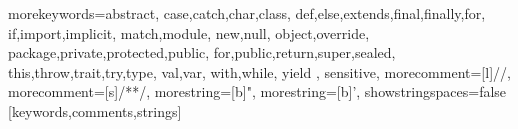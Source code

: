 
%
{morekeywords={abstract,%
  case,catch,char,class,%
  def,else,extends,final,finally,for,%
  if,import,implicit,%
  match,module,%
  new,null,%
  object,override,%
  package,private,protected,public,%
  for,public,return,super,sealed,%
  this,throw,trait,try,type,%
  val,var,%
  with,while,%
  yield%
  },%
  sensitive,%
  morecomment=[l]//,%
  morecomment=[s]{/*}{*/},%
  morestring=[b]",%
  morestring=[b]',%
  showstringspaces=false%
}[keywords,comments,strings]%



\newcommand{\commentstyle}[1]{\slseries{#1}}
\newcommand{\keywordstyle}[1]{\bfseries{#1}}


\newcommand{\code}[1]{\lstinline[language=Scala,mathescape=true,columns=fixed,basicstyle=\ttfamily]|#1|}

\newcommand{\lval}{\code{val}}
\newcommand{\ldef}{\code{def}}
\newcommand{\lfor}{\code{for}}
\newcommand{\lRand}[1][]{\code{Rand#1}}
\newcommand{\lflatMap}[1][]{\code{flatMap#1}}
\newcommand{\lchoice}[1][]{\code{choice#1}}
\newcommand{\lalways}[1][]{\code{always#1}}
\newcommand{\lnever}{\code{never}}
\newcommand{\lflip}[1][]{\code{flip#1}}
\newcommand{\lif}{\code{if}}
\newcommand{\lopand}{\code{\&\&}}
\newcommand{\lopor}{\code{||}}
\newcommand{\lopeq}{\code{==}}
\newcommand{\lplus}{\code{+}}
\newcommand{\lminus}{\code{-}}

\newenvironment{sitemize}{
\begin{itemize}
  \setlength{\itemsep}{1pt}
  \setlength{\parskip}{0pt}
  \setlength{\parsep}{0pt}
}{\end{itemize}}

\newenvironment{senumerate}{
\begin{enumerate}
  \setlength{\itemsep}{1pt}
  \setlength{\parskip}{0pt}
  \setlength{\parsep}{0pt}
}{\end{enumerate}}

\newcommand{\mypar}[1]{{\bf #1.}}


\newcommand{\remark}[1]{{\bf $\clubsuit$ #1 $\spadesuit$}}
\newcommand{\note}[1]{{\color{red}[#1]}}
\newcommand{\todo}[1]{\note{TODO: #1}}

\newcommand{\comment}[1]{}
